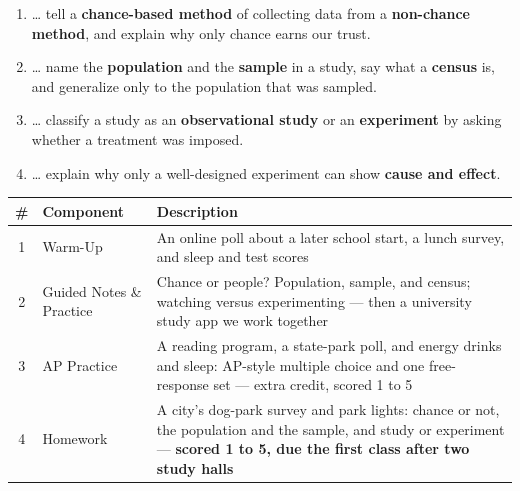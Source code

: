 \documentclass[12pt]{article}
\begin{document}

\namedateperiod
\vspace{0.18in}

\boxguard[14]
\begin{learningtargetbox}
\small
\begin{enumerate}[leftmargin=1.5em, itemsep=5pt]
  \item \ldots{} tell a \textbf{chance-based method} of collecting data from a
        \textbf{non-chance method}, and explain why only chance earns our trust.
  \item \ldots{} name the \textbf{population} and the \textbf{sample} in a study, say what a
        \textbf{census} is, and generalize only to the population that was sampled.
  \item \ldots{} classify a study as an \textbf{observational study} or an
        \textbf{experiment} by asking whether a treatment was imposed.
  \item \ldots{} explain why only a well-designed experiment can show \textbf{cause and
        effect}.
\end{enumerate}
\end{learningtargetbox}

\vspace{0.14in}

\boxguard[14]
\begin{tocbox}
\small
\renewcommand{\arraystretch}{1.5}
\begin{tabularx}{\linewidth}{@{} c l X @{}}
\rowcolor{sky}
\textbf{\#} & \textbf{Component} & \textbf{Description} \\
\midrule
1 & Warm-Up & An online poll about a later school start, a lunch survey, and sleep and test
                 scores \\
2 & Guided Notes \& Practice & Chance or people? Population, sample, and census; watching
                 versus experimenting --- then a university study app we work together \\
3 & AP Practice & A reading program, a state-park poll, and energy drinks and sleep: AP-style
                 multiple choice and one free-response set --- extra credit, scored 1 to 5 \\
4 & Homework & A city's dog-park survey and park lights: chance or not, the population and the
                 sample, and study or experiment --- \textbf{scored 1 to 5, due the first class
                 after two study halls} \\
\end{tabularx}
\end{tocbox}
\end{document}
